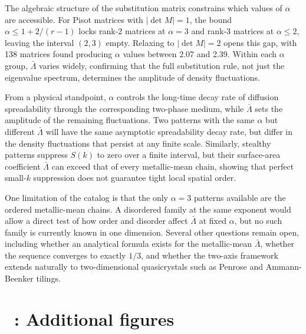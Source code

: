 \documentclass[11pt]{article}
\begin{document}
The algebraic structure of the substitution matrix constrains which values of $\alpha$ are accessible. For Pisot matrices with $|\det M| = 1$, the bound $\alpha \leq 1 + 2/(r-1)$ locks rank-2 matrices at $\alpha = 3$ and rank-3 matrices at $\alpha \leq 2$, leaving the interval $(2,3)$ empty. Relaxing to $|\det M| = 2$ opens this gap, with 138 matrices found producing $\alpha$ values between 2.07 and 2.39. Within each $\alpha$ group, $\bar\Lambda$ varies widely, confirming that the full substitution rule, not just the eigenvalue spectrum, determines the amplitude of density fluctuations.

From a physical standpoint, $\alpha$ controls the long-time decay rate of diffusion spreadability through the corresponding two-phase medium, while $\bar\Lambda$ sets the amplitude of the remaining fluctuations. Two patterns with the same $\alpha$ but different $\bar\Lambda$ will have the same asymptotic spreadability decay rate, but differ in the density fluctuations that persist at any finite scale. Similarly, stealthy patterns suppress $S(k)$ to zero over a finite interval, but their surface-area coefficient $\bar\Lambda$ can exceed that of every metallic-mean chain, showing that perfect small-$k$ suppression does not guarantee tight local spatial order.

One limitation of the catalog is that the only $\alpha = 3$ patterns available are the ordered metallic-mean chains. A disordered family at the same exponent would allow a direct test of how order and disorder affect $\bar\Lambda$ at fixed $\alpha$, but no such family is currently known in one dimension. Several other questions remain open, including whether an analytical formula exists for the metallic-mean $\bar\Lambda$, whether the sequence converges to exactly $1/3$, and whether the two-axis framework extends naturally to two-dimensional quasicrystals such as Penrose and Ammann-Beenker tilings.

\pagebreak
\printbibliography

\appendix

\section*{\appendixname~\thesection: Additional figures}
\label{app:extra-figures}

\end{document}
